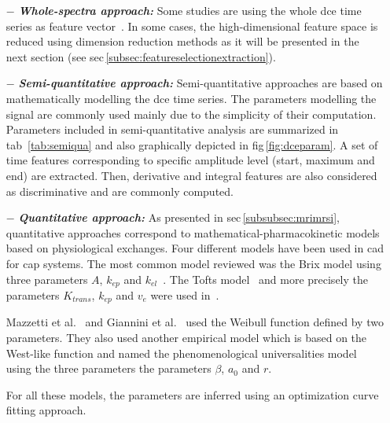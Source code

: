 \begin{enumerate}[leftmargin=*]

\item[$-$] \textbf{\textit{Whole-spectra approach:}} Some studies are using the whole \ac{dce} time series as feature vector~\cite{Ampeliotis2007,Ampeliotis2008,Tiwari2012,Viswanath2008a,Viswanath2008}. In some cases, the high-dimensional feature space is reduced using dimension reduction methods as it will be presented in the next section (see \ac{sec}\,\ref{subsec:featureselectionextraction}).

\item[$-$] \textbf{\textit{Semi-quantitative approach:}} Semi-quantitative approaches are based on mathematically modelling the \ac{dce} time series. The parameters modelling the signal are commonly used mainly due to the simplicity of their computation. Parameters included in semi-quantitative analysis are summarized in \ac{tab}~\ref{tab:semiqua} and also graphically depicted in \ac{fig}\,\ref{fig:dceparam}. A set of time features corresponding to specific amplitude level (start, maximum and end) are extracted. Then, derivative and integral features are also considered as discriminative and are commonly computed.

\item[$-$] \textbf{\textit{Quantitative approach:}} As presented in \ac{sec}\,\ref{subsubsec:mrimrsi}, quantitative approaches correspond to mathematical-pharmacokinetic models based on physiological exchanges. Four different models have been used in \ac{cad} for \ac{cap} systems. The most common model reviewed was the Brix model using three parameters $A$, $k_{ep}$ and $k_{el}$~\cite{Artan2009,Artan2010,Sung2011,Liu2009,Ozer2009,Ozer2010}. The Tofts model~\cite{Tofts1997} and more precisely the parameters $K_{trans}$, $k_{ep}$ and $v_e$ were used in~\cite{Langer2009,Litjens2011,Litjens2012,Litjens2014,Giannini2013,Niaf2011,Niaf2012,Mazzetti2011}.

  Mazzetti et al.~\cite{Mazzetti2011} and Giannini et al.~\cite{Giannini2013} used the Weibull function defined by two parameters. They also used another empirical model which is based on the West-like function and named the phenomenological universalities model~\cite{Castorina2006} using the three parameters the parameters $\beta$, $a_0$ and $r$.

  For all these models, the parameters are inferred using an optimization curve fitting approach.

\end{enumerate}


